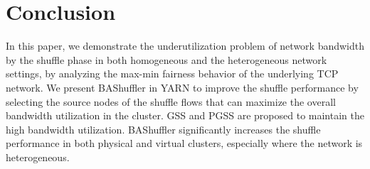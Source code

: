 \documentclass[10pt,journal,compsoc]{IEEEtran}
\begin{document}
\section{Conclusion}\label{section:conclusion}
In this paper, we demonstrate the underutilization problem of network
bandwidth by the shuffle phase in both homogeneous and the heterogeneous
network settings, by analyzing the max-min fairness behavior of the
underlying TCP network.
We present BAShuffler in YARN to improve the shuffle performance by
selecting the source nodes of the shuffle flows that can
maximize the overall bandwidth utilization in the cluster. 
GSS and PGSS are proposed to maintain the high bandwidth utilization. 
BAShuffler significantly increases the shuffle performance in both
physical and virtual clusters, especially where the network is
heterogeneous.



%
%

\end{document}
